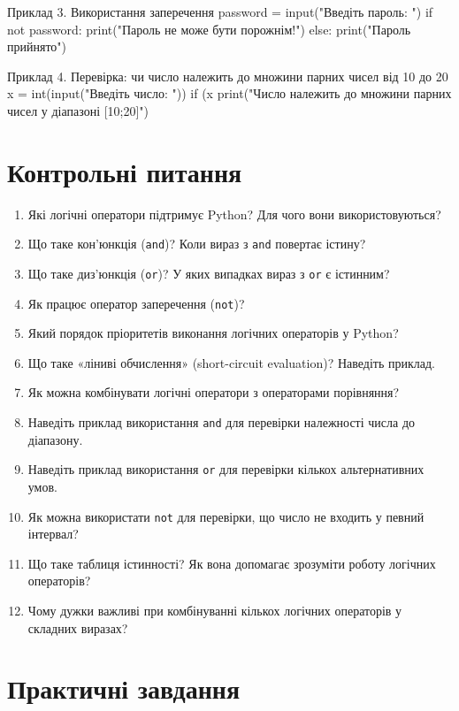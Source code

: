 \begin{py}{Приклад 3. Використання заперечення}
password = input("Введіть пароль: ")
if not password:
    print("Пароль не може бути порожнім!")
else:
    print("Пароль прийнято")
\end{py}


\begin{py}{ Приклад 4. Перевірка: чи число належить до множини парних чисел від 10 до 20}
x = int(input("Введіть число: "))
if (x %
    print("Число належить до множини парних чисел 
     у діапазоні [10;20]")
\end{py}



\section*{Контрольні питання}

\begin{enumerate}
	\item Які логічні оператори підтримує Python? Для чого вони використовуються?
	\item Що таке кон’юнкція (\texttt{and})? Коли вираз з \texttt{and} повертає істину?
	\item Що таке диз’юнкція (\texttt{or})? У яких випадках вираз з \texttt{or} є істинним?
	\item Як працює оператор заперечення (\texttt{not})?
	\item Який порядок пріоритетів виконання логічних операторів у Python?
	\item Що таке «ліниві обчислення» (short-circuit evaluation)? Наведіть приклад.
	\item Як можна комбінувати логічні оператори з операторами порівняння?
	\item Наведіть приклад використання \texttt{and} для перевірки належності числа до діапазону.
	\item Наведіть приклад використання \texttt{or} для перевірки кількох альтернативних умов.
	\item Як можна використати \texttt{not} для перевірки, що число не входить у певний інтервал?
	\item Що таке таблиця істинності? Як вона допомагає зрозуміти роботу логічних операторів?
	\item Чому дужки важливі при комбінуванні кількох логічних операторів у складних виразах?
\end{enumerate}

\section*{Практичні завдання}

